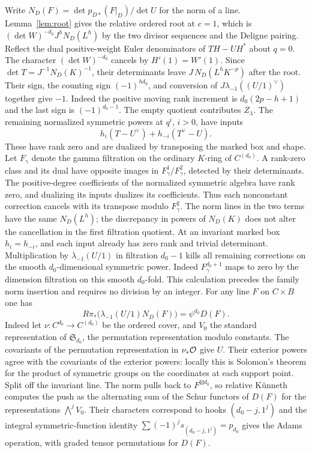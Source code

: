 Write $N_D(F)=\det p_{D*}(F|_D)/\det U$ for the norm of a line. Lemma~\ref{lem:root} gives the relative ordered root at $c=1$, which is $(\det W)^{-d_0}J^h N_D(L^h)$ by the two divisor sequences and the Deligne pairing. Reflect the dual positive-weight Euler denominators of $TH-UH^*$ about $q=0$. The character $(\det W)^{-d_0}$ cancels by $H'(1)=W'(1)$. Since $\det T=J^{-1}N_D(K)^{-1}$, their determinants leave $J\,N_D(L^hK^{-p})$ after the root. Their sign, the counting sign $(-1)^{hd_0}$, and conversion of $J\lambda_{-1}((U/1)^\vee)$ together give $-1$. Indeed the positive moving rank increment is $d_0(2p-h+1)$ and the last sign is $(-1)^{d_0-1}$. The empty quotient contributes $Z_\lambda$. The remaining normalized symmetric powers at $q^i$, $i>0$, have inputs
\[
h_i(T-U^\vee)+h_{-i}(T^\vee-U).
\]
These have rank zero and are dualized by transposing the marked box and shape. Let $F_\gamma$ denote the gamma filtration on the ordinary $K$-ring of $C^{(d_0)}$. A rank-zero class and its dual have opposite images in $F_\gamma^1/F_\gamma^2$, detected by their determinants. The positive-degree coefficients of the normalized symmetric algebra have rank zero, and dualizing its inputs dualizes its coefficients. Thus each nonconstant correction cancels with its transpose modulo $F_\gamma^2$. The norm lines in the two terms have the same $N_D(L^h)$; the discrepancy in powers of $N_D(K)$ does not alter the cancellation in the first filtration quotient. At an invariant marked box $h_i=h_{-i}$, and each input already has zero rank and trivial determinant. Multiplication by $\lambda_{-1}(U/1)$ in filtration $d_0-1$ kills all remaining corrections on the smooth $d_0$-dimensional symmetric power. Indeed $F_\gamma^{d_0+1}$ maps to zero by the dimension filtration on this smooth $d_0$-fold. This calculation precedes the family norm insertion and requires no division by an integer. For any line $F$ on $C\times B$ one has
\[
R\pi_*\bigl(\lambda_{-1}(U/1)N_D(F)\bigr)=\psi^{d_0}D(F).
\]
Indeed let $\nu:C^{d_0}\to C^{(d_0)}$ be the ordered cover, and $V_0$ the standard representation of $\mathfrak S_{d_0}$, the permutation representation modulo constants. The covariants of the permutation representation in $\nu_*\mathcal O$ give $U$. Their exterior powers agree with the covariants of the exterior powers: locally this is Solomon's theorem \cite{So} for the product of symmetric groups on the coordinates at each support point. Split off the invariant line. The norm pulls back to $F^{\boxtimes d_0}$, so relative K\"unneth computes the push as the alternating sum of the Schur functors of $D(F)$ for the representations $\bigwedge^j V_0$. Their characters correspond to hooks $(d_0-j,1^j)$ and the integral symmetric-function identity $\sum(-1)^j s_{(d_0-j,1^j)}=p_{d_0}$ gives the Adams operation, with graded tensor permutations for $D(F)$.

